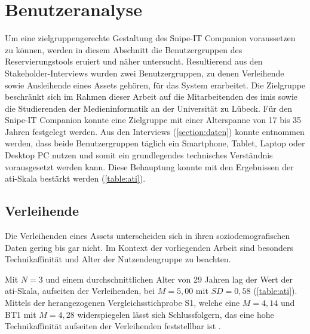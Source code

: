 
\section{Benutzeranalyse}
\label{section:benutzer}
Um eine zielgruppengerechte Gestaltung des Snipe-IT Companion voraussetzen zu können, werden in
diesem Abschnitt die Benutzergruppen des Reservierungstools eruiert und näher untersucht.
Resultierend aus den Stakeholder-Interviews wurden zwei Benutzergruppen, zu denen Verleihende sowie
Ausleihende eines Assets gehören, für das System erarbeitet. Die Zielgruppe beschränkt sich im
Rahmen dieser Arbeit auf die Mitarbeitenden des \ac{imis} sowie die Studierenden der
Medieninformatik an der Universität zu Lübeck. Für den Snipe-IT Companion konnte eine Zielgruppe mit
einer Alterspanne von 17 bis 35 Jahren festgelegt werden. Aus den Interviews (\ref{section:daten})
konnte entnommen werden, dass beide Benutzergruppen täglich ein Smartphone, Tablet, Laptop oder
Desktop PC nutzen und somit ein grundlegendes technisches Verständnis vorausgesetzt werden kann.
Diese Behauptung konnte mit den Ergebnissen der \ac{ati}-Skala bestärkt werden (\ref{table:ati}).


\subsection{Verleihende}
Die Verleihenden eines Assets unterscheiden sich in ihren soziodemografischen Daten gering bis gar
nicht. Im Kontext der vorliegenden Arbeit sind besonders Technikaffinität und Alter der
Nutzendengruppe zu beachten.

Mit $N=3$ und einem durchschnittlichen Alter von 29 Jahren lag der Wert der \ac{ati}-Skala,
aufseiten der Verleihenden, bei $M=5,00$ mit $SD=0,58$ (\ref{table:ati}). Mittels der herangezogenen
Vergleichsstichprobe S1, welche eine $M=4,14$ und BT1 mit  $M=4,28$ widerspiegelen lässt sich
Schlussfolgern, das eine hohe Technikaffinität aufseiten der Verleihenden feststellbar ist
\cite{franke_personal_2019}. 

